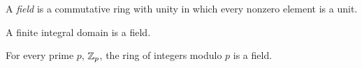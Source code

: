 
\begin{definition}[Field]
	A \textit{field} is a commutative ring with unity in which every nonzero element is a unit.
\end{definition}

\begin{theorem}
	A finite integral domain is a field.
\end{theorem}

\begin{corollary}
	For every prime $p$, $\mathbb{Z}_p$, the ring of integers modulo $p$ is a field.
\end{corollary}
